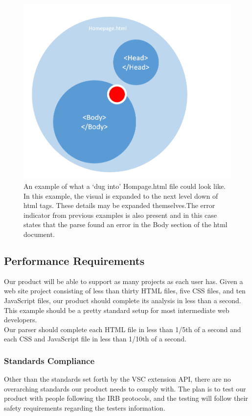 \documentclass[letterpaper,10pt,titlepage,draftclsnofoot,onecolumn,onesided] {IEEEtran}
\begin{document}
\begin{figure}
\includegraphics[scale=0.25]{digdown.png}
\caption{An example of what a `dug into' Hompage.html file could look like.
In this example, the visual is expanded to the next level down of html tags.
These details may be expanded themselves.The error indicator from previous examples is also present and in this case states that the parse found an error in the Body section of the html document.}
\end{figure}

\subsection{Performance Requirements}
Our product will be able to support as many projects as each user has. 
Given a web site project consisting of less than thirty HTML files, five CSS files, and ten JavaScript files, our product should complete its analysis in less than a second. 
This example should be a pretty standard setup for most intermediate web developers.
\\
Our parser should complete each HTML file in less than 1/5th of a second and each CSS and JavaScript file in less than 1/10th of a second.

\subsubsection{Standards Compliance}
Other than the standards set forth by the VSC extension API, there are no overarching standards our product needs to comply with.
The plan is to test our product with people following the IRB protocols, and the testing will follow their safety requirements regarding the testers information.
\end{document}
